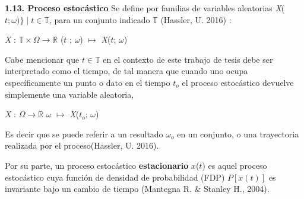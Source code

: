 
{
\Large  \textbf{1.13. Proceso estocástico} 
}
\newline
Se define por familias de variables aleatorias  \textit{X}($\mathit{t}; \mathit{\omega})\} \mid \mathit{t} \in \mathbb{T}$, para un conjunto indicado $\mathbb{T}$ (Hassler, U. 2016) :

\begin{center}
\hspace{1.7cm}\textit{X} : $\mathbb{T} \times \mathit{\Omega} \rightarrow \mathbb{R} $\newline 
($\mathit{t}$ ; $\mathit{\omega}$) $\mapsto$ \textit{X}($\mathit{t}$; $\omega$)
\end{center}


Cabe mencionar que $ \mathit{t} \in \mathbb{T}$ en el contexto de este trabajo de tesis debe ser interpretado como el \guillemotleft tiempo\guillemotright, de tal manera que cuando uno ocupa específicamente un punto o dato en el tiempo $\mathit{t}_{o}$ el proceso estocástico devuelve simplemente una variable aleatoria, \newline

\begin{center}
\hspace{1.77cm}\textit{X} : $ \mathit{\Omega} \rightarrow \mathbb{R} $\newline 
$\mathit{\omega}$ $\mapsto$ \textit{X}($\mathit{t_{o}}$; $\omega$)
\end{center}

Es decir que se puede referir a un resultado $\mathit{\omega_{o}}$ en un conjunto, o una \guillemotleft trayectoria \guillemotright realizada por el proceso(Hassler, U. 2016). 
\newline

Por su parte, un proceso estocástico \textbf{estacionario} $\mathit{x}$($\mathit{t}$) es aquel proceso estocástico cuya función de densidad de probabilidad (FDP) $P[\mathit{x}(\mathit{t})]$ es invariante bajo un cambio de tiempo (Mantegna R. \& Stanley H., 2004).
\newline

